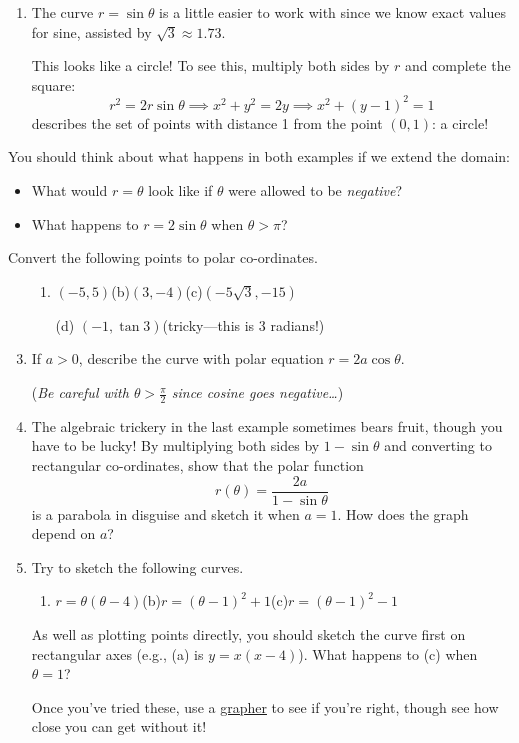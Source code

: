 \begin{examples}{}{}
\begin{enumerate}
	  \item The curve $r=\sin\theta$ is a little easier to work with since we know exact values for sine, assisted by $\sqrt 3\approx 1.73$.\par
		This looks like a circle! To see this, multiply both sides by $r$ and complete the square:
		\[
			r^2=2r\sin\theta\implies x^2+y^2=2y \implies x^2+(y-1)^2=1
		\]
		describes the set of points with distance 1 from the point $(0,1)$: a circle!
	\end{enumerate}
\end{examples}

You should think about what happens in both examples if we extend the domain:
\begin{itemize}
  \item What would $r=\theta$ look like if $\theta$ were allowed to be \emph{negative}?
  \item What happens to $r=2\sin\theta$ when $\theta>\pi$? 
\end{itemize}


\clearpage


\begin{exercises}{}{}
	\exstart Convert the following points to polar co-ordinates.
	\begin{enumerate}\setcounter{enumi}{1}
	  \item[]\begin{enumerate}
	    \item $(-5,5)$\qquad (b)\lstsp $(3,-4)$\qquad (c)\lstsp $(-5\sqrt 3,-15)$
	    \item[(d)] $(-1,\tan 3)$\quad (tricky---this is 3 radians!)
	  \end{enumerate}
	  
	  \item If $a>0$, describe the curve with polar equation $r=2a\cos\theta$.\par
	  (\emph{Be careful with $\theta>\frac\pi 2$ since cosine goes negative\ldots})
	  
	  \item The algebraic trickery in the last example sometimes bears fruit, though you have to be lucky! By multiplying both sides by $1-\sin\theta$ and converting to rectangular co-ordinates, show that the polar function
		\[
			r(\theta)=\frac{2a}{1-\sin\theta}
		\]
		is a parabola in disguise and sketch it when $a=1$. How does the graph depend on $a$?
		 
	  \item Try to sketch the following curves.
		\begin{enumerate}
	  	\item $r=\theta(\theta-4)$\qquad (b)\lstsp $r=(\theta-1)^2+1$\qquad (c)\lstsp $r=(\theta-1)^2-1$
		\end{enumerate}
		As well as plotting points directly, you should sketch the curve first on rectangular axes (e.g.,{} (a) is $y=x(x-4)$). What happens to (c) when $\theta=1$?\par
		Once you've tried these, use a \href{https://www.desmos.com/calculator}{grapher} to see if you're right, though see how close you can get without it! 
	\end{enumerate}
\end{exercises}


